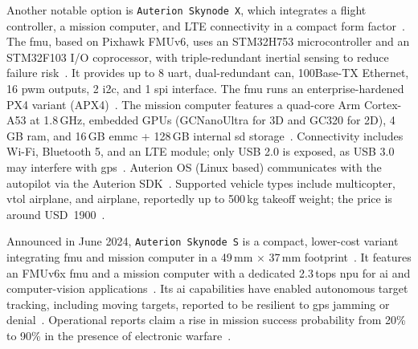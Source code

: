 Another notable option is \lstinline|Auterion Skynode X|, which integrates a
flight controller, a mission computer, and LTE connectivity in a compact form
factor~\cite{skynodeXWebsite}.
The \gls{fmu}, based on Pixhawk FMUv6, uses an STM32H753 microcontroller and an STM32F103 I/O coprocessor, with triple-redundant inertial sensing to reduce failure risk~\cite{skynodeXDatasheet}. 
It provides up to 8 \gls{uart}, dual-redundant \gls{can}, 100Base-TX Ethernet, 16 \gls{pwm} outputs, 2 \gls{i2c}, and 1 \gls{spi} interface. 
The \gls{fmu} runs an enterprise-hardened PX4 variant (APX4)~\cite{skynodeXDatasheet}. 
The mission computer features a quad-core Arm Cortex-A53 at 1.8\,GHz, embedded GPUs (GCNanoUltra for 3D and GC320 for 2D), 4\,GB \gls{ram}, and 16\,GB \gls{emmc} + 128\,GB internal \gls{sd} storage~\cite{skynodeXDatasheet}. 
Connectivity includes Wi-Fi, Bluetooth 5, and an LTE module; only USB 2.0 is exposed, as USB 3.0 may interfere with \gls{gps}~\cite{skynodeXDatasheet}. 
Auterion OS (Linux based) communicates with the autopilot via the Auterion SDK~\cite{skynodeX-px4}. 
Supported vehicle types include multicopter, \gls{vtol} airplane, and airplane, reportedly up to 500\,kg takeoff weight; the price is around USD~1900~\cite{skynodePrice}.

Announced in June 2024, \lstinline|Auterion Skynode S| is a compact, lower-cost
variant integrating \gls{fmu} and mission computer in a 49\,mm \(\times\) 37\,mm
footprint~\cite{skynodeS-pressRelease}.
It features an FMUv6x \gls{fmu} and a mission computer with a dedicated
2.3\,\gls{tops} \gls{npu} for \gls{ai} and computer-vision
applications~\cite{skynodeS-pressRelease}.
Its \gls{ai} capabilities have enabled autonomous target tracking, including
moving targets, reported to be resilient to \gls{gps} jamming or
denial~\cite{skynodeS-noJamming}.
Operational reports claim a rise in mission success probability from 20\% to
90\% in the presence of electronic warfare~\cite{skynodeS-noJamming-2}.

